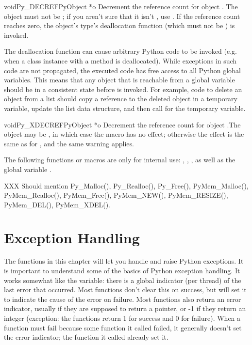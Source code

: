 \documentclass[twoside,openright]{report}
\begin{document}
\begin{cfuncdesc}{void}{Py_DECREF}{PyObject *o}
Decrement the reference count for object .  The object must
not be \NULL{}; if you aren't sure that it isn't \NULL{}, use
.  If the reference count reaches zero, the object's
type's deallocation function (which must not be \NULL{}) is invoked.

 The deallocation function can cause arbitrary Python
code to be invoked (e.g. when a class instance with a 
method is deallocated).  While exceptions in such code are not
propagated, the executed code has free access to all Python global
variables.  This means that any object that is reachable from a global
variable should be in a consistent state before  is
invoked.  For example, code to delete an object from a list should
copy a reference to the deleted object in a temporary variable, update
the list data structure, and then call  for the
temporary variable.
\end{cfuncdesc}

\begin{cfuncdesc}{void}{Py_XDECREF}{PyObject *o}
Decrement the reference count for object .The object may be
\NULL{}, in which case the macro has no effect; otherwise the
effect is the same as for , and the same warning
applies.
\end{cfuncdesc}

The following functions or macros are only for internal use:
, , ,
as well as the global variable .

XXX Should mention Py_Malloc(), Py_Realloc(), Py_Free(),
PyMem_Malloc(), PyMem_Realloc(), PyMem_Free(), PyMem_NEW(),
PyMem_RESIZE(), PyMem_DEL(), PyMem_XDEL().


\chapter{Exception Handling}

The functions in this chapter will let you handle and raise Python
exceptions.  It is important to understand some of the basics of
Python exception handling.  It works somewhat like the \UNIX{}
 variable: there is a global indicator (per thread) of the
last error that occurred.  Most functions don't clear this on success,
but will set it to indicate the cause of the error on failure.  Most
functions also return an error indicator, usually \NULL{} if they are
supposed to return a pointer, or -1 if they return an integer
(exception: the  functions return 1 for success and
0 for failure).  When a function must fail because some function it
called failed, it generally doesn't set the error indicator; the
function it called already set it.
\end{document}
